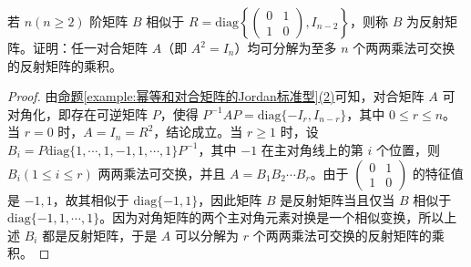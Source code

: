 \documentclass[../../main.tex]{subfiles}%
\begin{document}
\begin{example}
若 $n(n\geqslant  2)$ 阶矩阵 $B$ 相似于 $R = \mathrm{diag}\left\{\begin{pmatrix}0 & 1 \\ 1 & 0\end{pmatrix},I_{n - 2}\right\}$，则称 $B$ 为反射矩阵。证明：任一对合矩阵 $A$（即 $A^2 = I_n$）均可分解为至多 $n$ 个两两乘法可交换的反射矩阵的乘积。
\end{example}
\begin{proof}
由\hyperref[example:幂等和对合矩阵的Jordan标准型]{命题\ref{example:幂等和对合矩阵的Jordan标准型}(2)}可知，对合矩阵 $A$ 可对角化，即存在可逆矩阵 $P$，使得 $P^{-1}AP=\mathrm{diag}\{-I_r,I_{n - r}\}$，其中 $0\leqslant  r\leqslant  n$。当 $r = 0$ 时，$A = I_n = R^2$，结论成立。当 $r\geqslant  1$ 时，设 $B_i = P\mathrm{diag}\{1,\cdots,1,-1,1,\cdots,1\}P^{-1}$，其中 $-1$ 在主对角线上的第 $i$ 个位置，则 $B_i(1\leqslant  i\leqslant  r)$ 两两乘法可交换，并且 $A = B_1B_2\cdots B_r$。由于 $\begin{pmatrix}0 & 1 \\ 1 & 0\end{pmatrix}$ 的特征值是 $-1,1$，故其相似于 $\mathrm{diag}\{-1,1\}$，因此矩阵 $B$ 是反射矩阵当且仅当 $B$ 相似于 $\mathrm{diag}\{-1,1,\cdots,1\}$。因为对角矩阵的两个主对角元素对换是一个相似变换，所以上述 $B_i$ 都是反射矩阵，于是 $A$ 可以分解为 $r$ 个两两乘法可交换的反射矩阵的乘积。
\end{proof}
\end{document}
